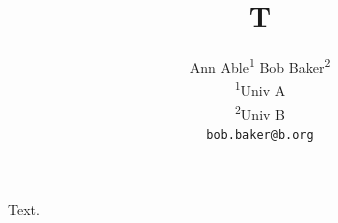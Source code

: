 \documentclass{article}
\title{T}
\author{\begin{tabular}{c}
Ann Able\textsuperscript{1} \quad Bob Baker\textsuperscript{2}\\
\small \textsuperscript{1}Univ A\\
\small \textsuperscript{2}Univ B\\
\footnotesize \texttt{bob.baker@b.org}
\end{tabular}}
\begin{document}
\maketitle
Text.
\end{document}
